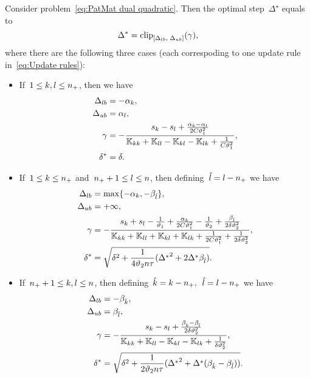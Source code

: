 \begin{theorem}\label{thm:Update rule PatMat with quadratic loss}
  Consider problem~\eqref{eq:PatMat dual quadratic}. Then the optimal step~$\Delta^\star$ equals to
  \begin{equation}\label{eq:Delta_optimal2}
    \Delta^{*} = \clip{\Delta_{lb}}{\Delta_{ub}}{\gamma},
  \end{equation}
  where there are the following three cases (each correspoding to one update rule in~\eqref{eq:Update rules}):
  \begin{itemize}
    \item If~$1\le k, l \le n_{+}$, then we have
    \begin{align*}
      \Delta_{lb} & = -\alpha_k, \\
      \Delta_{ub} & = \alpha_l, \\
      \gamma      & = -\frac{s_k - s_l + \frac{\alpha_k - \alpha_l}{2C\vartheta_1^2}}{\mathbb{K}_{kk} + \mathbb{K}_{ll} - \mathbb{K}_{kl} - \mathbb{K}_{lk} + \frac{1}{C\vartheta_1^2}}, \\
      \delta^{*}  & = \delta.
    \end{align*}
    \item If~$1 \le k \le n_{+}$ and~$n_{+} + 1 \le l \le n$, then defining~$\hat{l} = l - n_{+}$ we have
    \begin{align*}
      \Delta_{lb} & = \max\{- \alpha_k, - \beta_{\hat{l}}\}, \\
      \Delta_{ub} & = +\infty, \\
      \gamma      & = -\frac{s_k + s_l  - \frac{1}{\vartheta_1} + \frac{\alpha_k}{2C\vartheta_1^2} - \frac{1}{\vartheta_2} + \frac{\beta_{\hat{l}}}{2\delta\vartheta_2^2}}{\mathbb{K}_{kk} + \mathbb{K}_{ll} + \mathbb{K}_{kl} + \mathbb{K}_{lk} + \frac{1}{2C\vartheta_1^2} + \frac{1}{2\delta\vartheta_2^2}}, \\
      \delta^{*}  & = \sqrt{\delta^2 + \frac{1}{4 \vartheta_2 n \tau}({\Delta^{*}}^2 + 2 \Delta^{*} \beta_{\hat{l}})}.
    \end{align*}
    \item If~$n_{+} + 1\le k,l \le n$, then defining~$\hat{k} = k - n_{+},$~$\hat{l} = l - n_{+}$ we have
    \begin{align*}
      \Delta_{lb} & = - \beta_{\hat{k}}, \\
      \Delta_{ub} & = \beta_{\hat{l}}, \\
      \gamma      & = -\frac{s_k - s_l + \frac{\beta_{\hat{k}} - \beta_{\hat{l}}}{2\delta \vartheta_2^2}}{\mathbb{K}_{kk} + \mathbb{K}_{ll} - \mathbb{K}_{kl} - \mathbb{K}_{lk} + \frac{1}{\delta \vartheta_2^2}}, \\
      \delta^{*}  & = \sqrt{\delta^2 + \frac{1}{2 \vartheta_2 n \tau}({\Delta^{*}}^2 + \Delta^{*} (\beta_{\hat{k}} - \beta_{\hat{l}}))}.
    \end{align*}
  \end{itemize}
\end{theorem}

